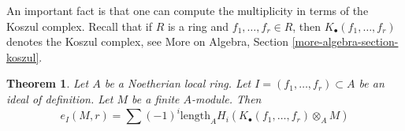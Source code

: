 \documentclass{stacks-project}
\newenvironment{reference}{\comment}{\endcomment}
\theoremstyle{plain}
\newtheorem{theorem}[subsection]{Theorem}
\theoremstyle{definition}
\theoremstyle{remark}
\numberwithin{equation}{subsection}
\begin{document}
\noindent
An important fact is that one can compute the multiplicity in terms
of the Koszul complex. Recall that if $R$ is a ring and
$f_1, \ldots, f_r \in R$, then $K_\bullet(f_1, \ldots, f_r)$
denotes the Koszul complex, see
More on Algebra, Section \ref{more-algebra-section-koszul}.

\begin{theorem}
\label{theorem-multiplicity-with-koszul}
\begin{reference}
\cite[Theorem 1 in part B of Chapter IV]{Serre_algebre_locale}
\end{reference}
Let $A$ be a Noetherian local ring. Let $I = (f_1, \ldots, f_r) \subset A$
be an ideal of definition. Let $M$ be a finite $A$-module. Then
$$
e_I(M, r) = \sum
(-1)^i\text{length}_A H_i(K_\bullet(f_1, \ldots, f_r) \otimes_A M)
$$
\end{theorem}
\end{document}
